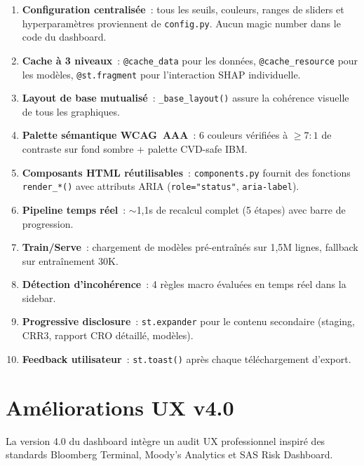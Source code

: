 \documentclass[12pt,a4paper]{article}
\begin{document}
\begin{interpretbox}
\begin{enumerate}[leftmargin=1em]
    \item \textbf{Configuration centralis\'ee}~: tous les seuils, couleurs, ranges de sliders et hyperparam\`etres proviennent de \texttt{config.py}. Aucun magic number dans le code du dashboard.
    \item \textbf{Cache \`a 3 niveaux}~: \texttt{@cache\_data} pour les donn\'ees, \texttt{@cache\_resource} pour les mod\`eles, \texttt{@st.fragment} pour l'interaction SHAP individuelle.
    \item \textbf{Layout de base mutualis\'e}~: \texttt{\_base\_layout()} assure la coh\'erence visuelle de tous les graphiques.
    \item \textbf{Palette s\'emantique WCAG~AAA}~: 6 couleurs v\'erifi\'ees \`a $\geq 7{:}1$ de contraste sur fond sombre + palette CVD-safe IBM.
    \item \textbf{Composants HTML r\'eutilisables}~: \texttt{components.py} fournit des fonctions \texttt{render\_*()} avec attributs ARIA (\texttt{role="status"}, \texttt{aria-label}).
    \item \textbf{Pipeline temps r\'eel}~: $\sim$1,1s de recalcul complet (5 \'etapes) avec barre de progression.
    \item \textbf{Train/Serve}~: chargement de mod\`eles pr\'e-entra\^{i}n\'es sur 1,5M lignes, fallback sur entra\^{i}nement 30K.
    \item \textbf{D\'etection d'incoh\'erence}~: 4 r\`egles macro \'evalu\'ees en temps r\'eel dans la sidebar.
    \item \textbf{Progressive disclosure}~: \texttt{st.expander} pour le contenu secondaire (staging, CRR3, rapport CRO d\'etaill\'e, mod\`eles).
    \item \textbf{Feedback utilisateur}~: \texttt{st.toast()} apr\`es chaque t\'el\'echargement d'export.
\end{enumerate}
\end{interpretbox}


\section{Am\'eliorations UX v4.0}
\label{sec:ux_v4}

La version 4.0 du dashboard int\`egre un audit UX professionnel inspir\'e des standards Bloomberg Terminal, Moody's Analytics et SAS Risk Dashboard.
\end{document}
